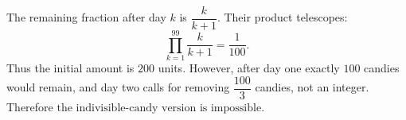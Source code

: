 The remaining fraction after day $k$ is $\dfrac{k}{k+1}$. Their product telescopes:
\[\prod_{k=1}^{99}\dfrac{k}{k+1}=\dfrac{1}{100}.\]
Thus the initial amount is $\boxed{200}$ units. However, after day one exactly $100$ candies would remain, and day two calls for removing $\dfrac{100}{3}$ candies, not an integer. Therefore $\boxed{\text{the indivisible-candy version is impossible}}$.
